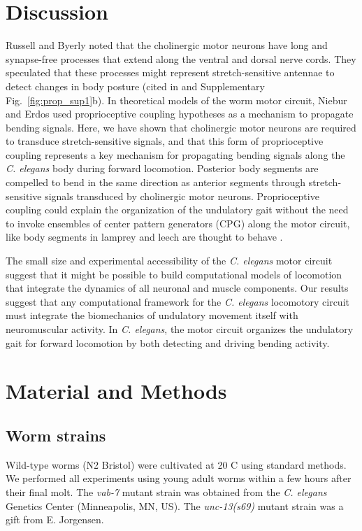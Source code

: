 \section{Discussion}
Russell and Byerly noted that the cholinergic motor neurons have long and synapse-free 
processes that extend along the ventral and dorsal nerve cords. They speculated that these 
processes might represent stretch-sensitive antennae to detect changes in body posture (cited in 
 \citep{white_structure_1986,chen_neuronal_2007} and Supplementary Fig.~\ref{fig:prop_sup1}b). In theoretical models of the worm motor circuit, 
Niebur and Erdos \citep{niebur_theory_1991} used proprioceptive coupling hypotheses as a mechanism to propagate 
bending signals. Here, we have shown that cholinergic motor neurons are required to 
transduce stretch-sensitive signals, and that this form of proprioceptive coupling represents a key 
mechanism for propagating bending signals along the \textit{C. elegans} body during forward 
locomotion. Posterior body segments are compelled to bend in the same direction as anterior 
segments through stretch-sensitive signals transduced by cholinergic motor neurons. 
Proprioceptive coupling could explain the organization of the undulatory gait without the need to 
invoke ensembles of center pattern generators (CPG) along the motor circuit, like body segments 
in lamprey and leech are thought to behave \citep{ermentrout_frequency_1984}.  
 
The small size and experimental accessibility of the \textit{C. elegans} motor circuit suggest that it might 
be possible to build computational models of locomotion that integrate the dynamics of all 
neuronal and muscle components. Our results suggest that any computational framework for the 
\textit{C. elegans} locomotory circuit must integrate the biomechanics of undulatory movement itself 
with neuromuscular activity. In \textit{C. elegans}, the motor circuit organizes the undulatory gait for forward locomotion by both detecting and driving bending activity.


\section{Material and Methods} 
 
\subsection{Worm strains} 
Wild-type worms (N2 Bristol) were cultivated at 20 \textdegree C using standard methods. 
We performed all experiments using young adult worms within a few hours after their final molt. 
The \textit{vab-7} mutant strain was obtained from the \textit{C. elegans} Genetics Center (Minneapolis, MN, US). The \textit{unc-13(s69)} mutant strain was a gift from E. Jorgensen. 
 
